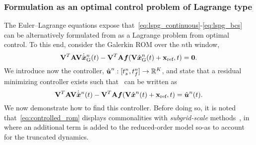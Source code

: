 \subsubsection{Formulation as an optimal control problem of Lagrange type}\label{sec:optimal_control} The
Euler--Lagrange equations expose that~\eqref{eq:lspg_continuous}-\eqref{eq:lspg_bcs} can be alternatively formulated from as a Lagrange
problem from optimal control. To this end, consider the Galerkin ROM over the $n$th window, 
$$ \basisspace^T \stweightingMatArgt{n}{t} \basisspace
 \genstateGalerkinDotArg{n}{t} - \basisspace^T \stweightingMatArgt{n}{t}
\velocity(\basisspace \genstateGalerkinArg{n}{t} + \stateIntercept,t) = \boldsymbol 0.$$
We introduce now the controller, $\controllerArgnt{n} :  [\timeStartArg{n},\timeEndArg{n}] \rightarrow
\RR{\romdim}$,
and state that a residual minimizing controller exists such that \methodAcronym\ can be written as 
\begin{equation}\label{eq:controlled_rom}
 \basisspace^T
\stweightingMatArgt{n}{t} \basisspace \genstateDotArg{n}{t}  - \basisspace^T
\stweightingMatArgt{n}{t}\velocity(\basisspace \genstateArg{n}{t} +
\stateIntercept,t) = \controllerArg{n}{t}. 
 \end{equation}
We now demonstrate how to find this controller.
Before doing so, it is noted that~\eqref{eq:controlled_rom} displays commonalities with \textit{subgrid-scale}
methods~\cite{iliescu_pod_eddyviscosity,iliescu_vms_pod_ns,iliescu_ciazzo_residual_rom,parish_apg,wentland_apg,Wang:269133,San2018},
in where an additional term is added to the reduced-order model so-as to
account for the truncated dynamics. 

